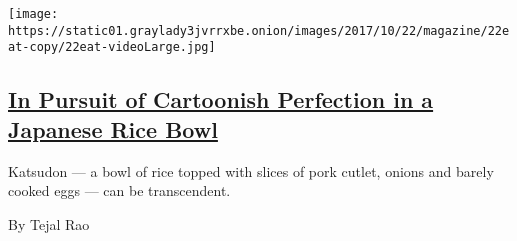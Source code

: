 \begin{enumerate}
  \texttt{[image: https://static01.graylady3jvrrxbe.onion/images/2017/10/22/magazine/22eat-copy/22eat-videoLarge.jpg]}

  \hypertarget{in-pursuit-of-cartoonish-perfection-in-a-japanese-rice-bowl}{%
  \subsection{\texorpdfstring{\href{/2017/10/19/magazine/in-pursuit-of-cartoonish-perfection-in-a-japanese-rice-bowl.html}{In
  Pursuit of Cartoonish Perfection in a Japanese Rice
  Bowl}}{In Pursuit of Cartoonish Perfection in a Japanese Rice Bowl}}\label{in-pursuit-of-cartoonish-perfection-in-a-japanese-rice-bowl}}

  Katsudon --- a bowl of rice topped with slices of pork cutlet, onions
  and barely cooked eggs --- can be transcendent.

  By Tejal Rao
\end{enumerate}

